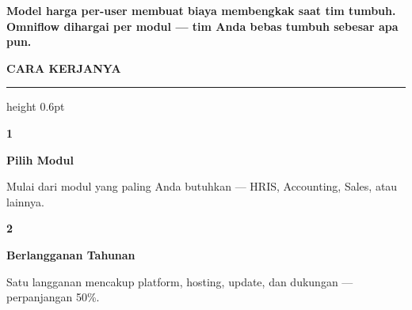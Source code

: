 \documentclass[a4paper]{article}
\newcommand{\sectiontitle}[1]{%
    \vspace{10pt}%
    {\fontsize{13}{16}\selectfont\bfseries\color{BlueDark} #1}\par\vspace{3pt}%
    {\color{BluePrimary}\hrule height 0.6pt}\par\vspace{8pt}%
}
\begin{document}
\vspace{8pt}

{\setlength{\fboxsep}{7pt}\setlength{\fboxrule}{0pt}%
\noindent\colorbox{BluePrimary}{%
    \begin{minipage}{\dimexpr\textwidth-2\fboxsep\relax}
        \centering
        {\fontsize{9.5}{12}\selectfont\bfseries\color{White}
        Model harga per-user membuat biaya membengkak saat tim tumbuh. Omniflow dihargai per modul --- \textbf{tim Anda bebas tumbuh sebesar apa pun}.}
    \end{minipage}}}

\vspace{8pt}
\sectiontitle{CARA KERJANYA}

\begin{center}
\begin{minipage}[t]{0.318\textwidth}
    \colorbox{BlueBg}{%
        \begin{minipage}[t][4.0cm][c]{\dimexpr\linewidth-2\fboxsep\relax}
            \begin{center}{\fontsize{22}{26}\selectfont\bfseries\color{BluePrimary} 1}\end{center}
            \vspace{2pt}
            \begin{center}
                {\fontsize{10}{13}\selectfont\bfseries\color{BlueDark} Pilih Modul}\par\vspace{3pt}
                {\fontsize{9}{12}\selectfont\color{TextDark} Mulai dari modul yang paling Anda butuhkan --- HRIS, Accounting, Sales, atau lainnya.}
            \end{center}
        \end{minipage}}
\end{minipage}%
\hfill
\begin{minipage}[t]{0.318\textwidth}
    \colorbox{BlueBg}{%
        \begin{minipage}[t][4.0cm][c]{\dimexpr\linewidth-2\fboxsep\relax}
            \begin{center}{\fontsize{22}{26}\selectfont\bfseries\color{BluePrimary} 2}\end{center}
            \vspace{2pt}
            \begin{center}
                {\fontsize{10}{13}\selectfont\bfseries\color{BlueDark} Berlangganan Tahunan}\par\vspace{3pt}
                {\fontsize{9}{12}\selectfont\color{TextDark} Satu langganan mencakup platform, hosting, update, dan dukungan --- perpanjangan 50\%.}

\end{center}
\end{minipage}}
\end{minipage}
\end{center}
\end{document}
